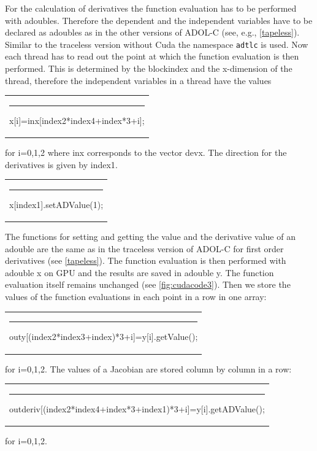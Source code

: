\documentclass[11pt,twoside]{article}
\begin{document}
For the calculation of derivatives the function evaluation has to be performed
with {\sf adouble}s. Therefore the dependent and the independent variables
have to be declared as {\sf adouble}s as in the other versions of ADOL-C (see, e.g., \autoref{tapeless}). 
Similar to the traceless version without Cuda the namespace \verb#adtlc# is used. 
Now each thread has to read out the point at which the function evaluation is 
then performed. This is determined by the blockindex and the x-dimension of 
the thread, therefore the independent variables in a thread
have the values
\begin{center}
  \begin{tabular}{l}
    {\sf \rule{0.5cm}{0pt}x[i]=inx[index2*index4+index*3+i];}\\
  \end{tabular}
\end{center}  
for {\sf i=0,1,2} where {\sf inx} corresponds to the vector {\sf devx}. The direction for 
the derivatives is given by {\sf index1}.
\begin{center}
  \begin{tabular}{l}
     {\sf \rule{0.5cm}{0pt}x[index1].setADValue(1);}\\
  \end{tabular}
\end{center} 
The functions for setting and getting the value and the derivative value of an 
{\sf adouble} are the same as in the traceless version of ADOL-C for first 
order derivatives (see \autoref{tapeless}).
The function evaluation is then performed with {\sf adouble x} on GPU and the results
are saved in {\sf adouble y}. The function evaluation itself remains unchanged
(see \autoref{fig:cudacode3}). Then we store the values of the function
evaluations in each point in a row in one array:
\begin{center}
  \begin{tabular}{l}
   {\sf \rule{0.5cm}{0pt}outy[(index2*index3+index)*3+i]=y[i].getValue();}\\
  \end{tabular}
\end{center} 
for {\sf i=0,1,2}. The values of a Jacobian are stored column by column in 
a row:
\begin{center}
  \begin{tabular}{l}
   {\sf \rule{0.5cm}{0pt}outderiv[(index2*index4+index*3+index1)*3+i]=y[i].getADValue();}\\
  \end{tabular}
\end{center} 
for {\sf i=0,1,2}. 
\end{document}

